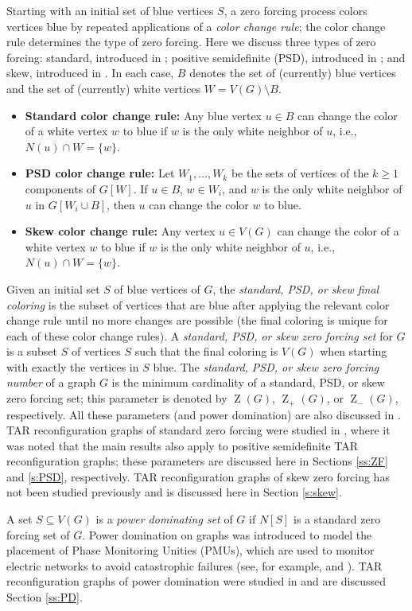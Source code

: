 \documentclass{article}
\numberwithin{figure}{section}
\numberwithin{table}{section}
\numberwithin{equation}{section}
\theoremstyle{definition}
\theoremstyle{definition}
\theoremstyle{definition}
\newcommand{\bit}{\begin{itemize}}
\newcommand{\eit}{\end{itemize}}
\newcommand{\Z}{\operatorname{Z}}
\newcommand{\Zs}{\operatorname{Z}_-}
\newcommand{\Zp}{\operatorname{Z}_+}
\begin{document}
{Starting with an initial set of  blue vertices $S$, a zero forcing process colors vertices blue by repeated applications of  a \emph{color change rule}; the color change rule determines the type of zero forcing.  Here we discuss three types of zero forcing: standard, introduced in \cite{AIM08}; positive semidefinite (PSD), introduced in \cite{smallparam}; and skew, introduced in \cite{IMA10}.   In each case, $B$ denotes the set of  (currently) blue vertices and the set of (currently) white vertices  $W = V(G)\setminus B$. %
\bit 
\item {\bf Standard color change rule:} Any blue vertex $u\in B$ can change the color of a white vertex $w$ to blue if $w$ is the only white neighbor of $u$, i.e., $N(u)\cap W=\{w\}$. 
\item {\bf PSD color change rule:}  Let $W_1,\dots, W_k$ be the sets of vertices of the $k\ge 1$ components of $G[W]$.  If $u\in B$, $w\in W_i$, and $w$ is the only white neighbor of  $u$ in $G[W_i\cup B]$, then $u$ can change the color  $w$ to blue. 
\item {\bf Skew color change rule:} Any vertex $u\in V(G)$ can change the color of a white vertex $w$ to blue if $w$ is the only white neighbor of $u$, i.e., $N(u)\cap W=\{w\}$. 
\eit
Given an initial set $S$ of blue vertices of    $G$, the  \emph{standard, PSD, or skew final coloring}    is the subset of vertices that  are blue after applying the relevant color change rule until no more changes are possible (the final coloring is unique for each of these color change rules).  A \emph{standard, PSD, or skew zero forcing set}   for  $G$  is a subset $S$ of vertices $S$ such that the final coloring is $V(G)$ when starting with exactly the vertices in $S$ blue. The \emph{standard, PSD, or skew  zero forcing number} of a graph $G$ is  the minimum cardinality of a standard, PSD, or skew zero forcing set; this parameter is denoted by $\Z(G)$, $\Zp(G)$, or $\Zs(G)$, respectively. All these parameters (and power domination) are also discussed in \cite[Chapter 9]{HLS22book}.  TAR  reconfiguration graphs of standard zero forcing were studied in \cite{XTARiso}, where it was noted that the main results also apply to positive semidefinite TAR reconfiguration graphs; these parameters are discussed here in Sections \ref{ss:ZF} and \ref{s:PSD}, respectively. TAR  reconfiguration graphs of skew zero forcing has not been studied previously and is discussed here in Section \ref{s:skew}.

  A set $S\subseteq V(G)$ is a \emph{power dominating set} of $G$ if $N[S]$ is a standard zero forcing set of $G$.  Power domination on graphs was introduced to model the placement of Phase Monitoring Unities (PMUs), which are used to monitor electric networks to avoid catastrophic failures (see, for example, \cite{HHHH02} and \cite{BH}). 
TAR  reconfiguration graphs of power domination were studied in \cite{PDrecon} and are discussed Section \ref{ss:PD}.




}
\end{document}
